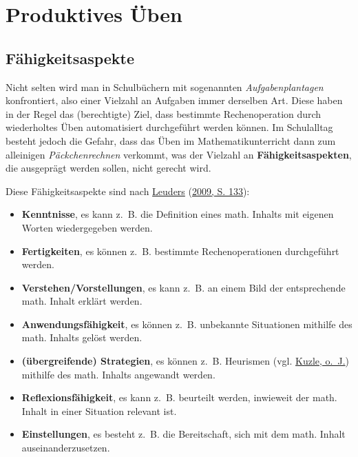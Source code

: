 \documentclass[
  ngerman,
]{scrbook}
\providecommand{\tightlist}{%
  \setlength{\itemsep}{0pt}\setlength{\parskip}{0pt}}
\theoremstyle{definition}
\theoremstyle{definition}
\theoremstyle{definition}
\theoremstyle{definition}
\theoremstyle{remark}
\begin{document}
\hypertarget{produktives-uxfcben}{%
\section{Produktives Üben}\label{produktives-uxfcben}}

\hypertarget{Faehigkeitsaspekte}{%
\subsection{Fähigkeitsaspekte}\label{Faehigkeitsaspekte}}

Nicht selten wird man in Schulbüchern mit sogenannten \emph{Aufgabenplantagen} konfrontiert, also einer Vielzahl an Aufgaben immer derselben Art. Diese haben in der Regel das (berechtigte) Ziel, dass bestimmte Rechenoperation durch wiederholtes Üben automatisiert durchgeführt werden können. Im Schulalltag besteht jedoch die Gefahr, dass das Üben im Mathematikunterricht dann zum alleinigen \emph{Päckchenrechnen} verkommt, was der Vielzahl an \textbf{Fähigkeitsaspekten}, die ausgeprägt werden sollen, nicht gerecht wird.

Diese Fähigkeitsaspekte sind nach \protect\hyperlink{ref-Leuders2009}{Leuders} (\protect\hyperlink{ref-Leuders2009}{2009, S. 133}):

\begin{itemize}
\tightlist
\item
  \textbf{Kenntnisse}, es kann z.~B. die Definition eines math. Inhalts mit eigenen Worten wiedergegeben werden.
\item
  \textbf{Fertigkeiten}, es können z.~B. bestimmte Rechenoperationen durchgeführt werden.
\item
  \textbf{Verstehen/Vorstellungen}, es kann z.~B. an einem Bild der entsprechende math. Inhalt erklärt werden.
\item
  \textbf{Anwendungsfähigkeit}, es können z.~B. unbekannte Situationen mithilfe des math. Inhalts gelöst werden.
\item
  \textbf{(übergreifende) Strategien}, es können z.~B. Heurismen (vgl. \protect\hyperlink{ref-Kuzle}{Kuzle, o.~J.}) mithilfe des math. Inhalts angewandt werden.
\item
  \textbf{Reflexionsfähigkeit}, es kann z.~B. beurteilt werden, inwieweit der math. Inhalt in einer Situation relevant ist.
\item
  \textbf{Einstellungen}, es besteht z.~B. die Bereitschaft, sich mit dem math. Inhalt auseinanderzusetzen.
\end{itemize}
\end{document}
